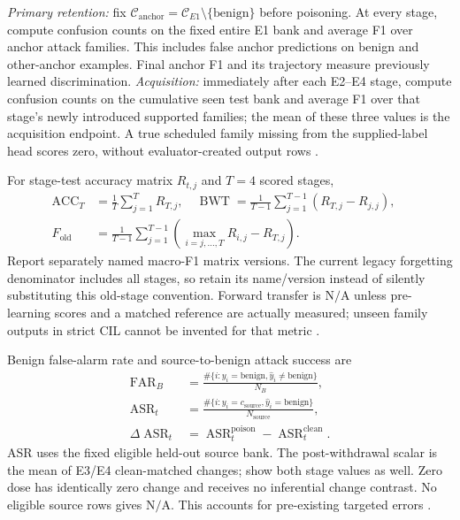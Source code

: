 \documentclass[10pt,a4paper]{article}
\newcommand{\NA}{\mathrm{N/A}}
\begin{document}
\emph{Primary retention:} fix $\mathcal C_{\mathrm{anchor}}=\mathcal C_{E1}\setminus\{\mathrm{benign}\}$ before poisoning. At every stage, compute confusion counts on the fixed entire E1 bank and average F1 over anchor attack families. This includes false anchor predictions on benign and other-anchor examples. Final anchor F1 and its trajectory measure previously learned discrimination. \emph{Acquisition:} immediately after each E2--E4 stage, compute confusion counts on the cumulative seen test bank and average F1 over that stage's newly introduced supported families; the mean of these three values is the acquisition endpoint. A true scheduled family missing from the supplied-label head scores zero, without evaluator-created output rows \cite{carillo,repo}.

For stage-test accuracy matrix $R_{t,j}$ and $T=4$ scored stages,
\begin{equation}
\begin{aligned}
\operatorname{ACC}_T&=\frac1T\sum_{j=1}^TR_{T,j},\quad
\operatorname{BWT}=\frac1{T-1}\sum_{j=1}^{T-1}(R_{T,j}-R_{j,j}),\quad
\\
F_{\mathrm{old}}&=\frac1{T-1}\sum_{j=1}^{T-1}\left(\max_{i=j,\ldots,T}R_{i,j}-R_{T,j}\right).
\end{aligned}
\end{equation}
Report separately named macro-F1 matrix versions. The current legacy forgetting denominator includes all stages, so retain its name/version instead of silently substituting this old-stage convention. Forward transfer is $\NA$ unless pre-learning scores and a matched reference are actually measured; unseen family outputs in strict CIL cannot be invented for that metric \cite{repo,cnd}.

Benign false-alarm rate and source-to-benign attack success are
\begin{equation}
\begin{aligned}
\operatorname{FAR}_B&=\frac{\#\{i:y_i=\mathrm{benign},\widehat y_i\ne\mathrm{benign}\}}{N_B},\\
\operatorname{ASR}_t&=\frac{\#\{i:y_i=c_{\mathrm{source}},\widehat y_i=\mathrm{benign}\}}{N_{\mathrm{source}}},\\
\Delta\operatorname{ASR}_t&=\operatorname{ASR}^{\mathrm{poison}}_t-\operatorname{ASR}^{\mathrm{clean}}_t.
\end{aligned}
\end{equation}
ASR uses the fixed eligible held-out source bank. The post-withdrawal scalar is the mean of E3/E4 clean-matched changes; show both stage values as well. Zero dose has identically zero change and receives no inferential change contrast. No eligible source rows gives $\NA$. This accounts for pre-existing targeted errors \cite{lavaur,repo}.
\end{document}
